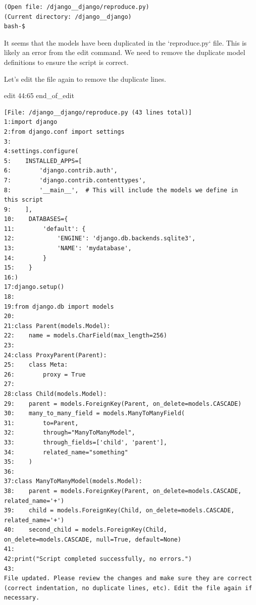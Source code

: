 {\begin{observationbox}
\begin{Verbatim}[breaklines=true, breakanywhere=true]
(Open file: /django__django/reproduce.py)
(Current directory: /django__django)
bash-$
\end{Verbatim}
\end{observationbox}
\begin{agentbox}
It seems that the models have been duplicated in the `reproduce.py` file. This is likely an error from the edit command. We need to remove the duplicate model definitions to ensure the script is correct.



Let's edit the file again to remove the duplicate lines.



\hrulefill
\begin{CodeVerbatim}[breaklines=true, breakanywhere=true]
edit 44:65
end_of_edit
\end{CodeVerbatim}
\end{agentbox}
\begin{observationbox}\begin{Verbatim}[breaklines=true, breakanywhere=true]
[File: /django__django/reproduce.py (43 lines total)]
1:import django
2:from django.conf import settings
3:
4:settings.configure(
5:    INSTALLED_APPS=[
6:        'django.contrib.auth',
7:        'django.contrib.contenttypes',
8:        '__main__',  # This will include the models we define in this script
9:    ],
10:    DATABASES={
11:        'default': {
12:            'ENGINE': 'django.db.backends.sqlite3',
13:            'NAME': 'mydatabase',
14:        }
15:    }
16:)
17:django.setup()
18:
19:from django.db import models
20:
21:class Parent(models.Model):
22:    name = models.CharField(max_length=256)
23:
24:class ProxyParent(Parent):
25:    class Meta:
26:        proxy = True
27:
28:class Child(models.Model):
29:    parent = models.ForeignKey(Parent, on_delete=models.CASCADE)
30:    many_to_many_field = models.ManyToManyField(
31:        to=Parent,
32:        through="ManyToManyModel",
33:        through_fields=['child', 'parent'],
34:        related_name="something"
35:    )
36:
37:class ManyToManyModel(models.Model):
38:    parent = models.ForeignKey(Parent, on_delete=models.CASCADE, related_name='+')
39:    child = models.ForeignKey(Child, on_delete=models.CASCADE, related_name='+')
40:    second_child = models.ForeignKey(Child, on_delete=models.CASCADE, null=True, default=None)
41:
42:print("Script completed successfully, no errors.")
43:
File updated. Please review the changes and make sure they are correct (correct indentation, no duplicate lines, etc). Edit the file again if necessary.


\end{Verbatim}
\end{observationbox}}
